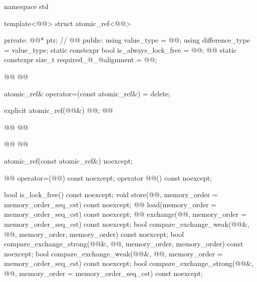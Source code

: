 \begin{codeblock}
namespace std {
  template<@@> struct atomic_ref<@@> {
  private:
    @@* ptr;        // \expos
    @@
  public:
    using value_type = @@;
    using difference_type = value_type;
    static constexpr bool is_always_lock_free = @@;
    @@
    static constexpr size_t required_@_@alignment = @@;

    @@
    @@

    atomic_ref& operator=(const atomic_ref&) = delete;

    explicit atomic_ref(@@&) @@;
    @@
    
    @@
    @@
    
    @@
    @@

    atomic_ref(const atomic_ref&) noexcept;

    @@ operator=(@@) const noexcept;
    operator @@() const noexcept;

    bool is_lock_free() const noexcept;
    void store(@@, memory_order = memory_order_seq_cst) const noexcept;
    @@ load(memory_order = memory_order_seq_cst) const noexcept;
    @@ exchange(@@,
                      memory_order = memory_order_seq_cst) const noexcept;
    bool compare_exchange_weak(@@&, @@,
                               memory_order, memory_order) const noexcept;
    bool compare_exchange_strong(@@&, @@,
                                 memory_order, memory_order) const noexcept;
    bool compare_exchange_weak(@@&, @@,
                               memory_order = memory_order_seq_cst) const noexcept;
    bool compare_exchange_strong(@@&, @@,
                                 memory_order = memory_order_seq_cst) const noexcept;

}}
\end{codeblock}
